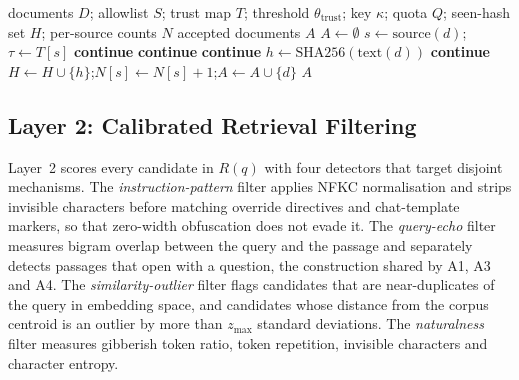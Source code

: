 \documentclass[information,article,submit,moreauthors]{Definitions/mdpi}
\begin{document}
\begin{algorithm}[H]
\caption{Layer 1: ingestion-time source verification}
\label{alg:l1}
\begin{algorithmic}[1]
\Require documents $D$; allowlist $S$; trust map $T$; threshold $\theta_{\mathrm{trust}}$;
key $\kappa$; quota $Q$; seen-hash set $H$; per-source counts $N$
\Ensure accepted documents $A$
\State $A \gets \emptyset$
  \State $s \gets \mathrm{source}(d)$;\quad $\tau \gets T[s]$ 
   \State \textbf{continue}  \EndIf
   \State \textbf{continue}  \EndIf
  \If{$\kappa \neq \bot$}
        \State \textbf{continue} 
     \EndIf
  \EndIf
  \State $h \gets \mathrm{SHA256}(\mathrm{text}(d))$
   \State \textbf{continue}  \EndIf
  \State $H \gets H \cup \{h\}$;\quad $N[s] \gets N[s] + 1$;\quad $A \gets A \cup \{d\}$
\EndFor
\State \Return $A$
\end{algorithmic}
\end{algorithm}

\subsection{Layer 2: Calibrated Retrieval Filtering}
\label{sec:l2}

Layer~2 scores every candidate in $R(q)$ with four detectors that target disjoint mechanisms.
The \emph{instruction-pattern} filter applies NFKC normalisation and strips invisible
characters before matching override directives and chat-template markers, so that zero-width
obfuscation does not evade it. The \emph{query-echo} filter measures bigram overlap between the
query and the passage and separately detects passages that open with a question, the
construction shared by A1, A3 and A4. The \emph{similarity-outlier} filter flags candidates
that are near-duplicates of the query in embedding space, and candidates whose distance from
the corpus centroid is an outlier by more than $z_{\max}$ standard deviations. The
\emph{naturalness} filter measures gibberish token ratio, token repetition, invisible
characters and character entropy.
\end{document}
